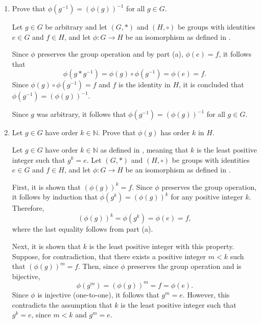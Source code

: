 \begin{enumerate}
\begin{enumerate}
\begin{subprove}
      For any $g \in G$, it is observed that $e * g = g$.
      Applying $\phi$ to both sides and using the property that $\phi$ preserves the group operation,
      \[
        \phi(e * g) = \phi(e) \circ \phi(g) = \phi(g).
      \]
      Since $\phi(g) \in H$ and $f$ is the identity in $H$, it follows that
      \[
        \phi(e) \circ \phi(g) = \phi(g) = f \circ \phi(g).
      \]
      By the cancellation property in $H$, it is concluded that $\phi(e) = f$.
    \end{subprove}
    \item Prove that $\phi\left(g^{-1}\right)=(\phi(g))^{-1}$ for all $g \in G$.
    \begin{subprove}
      Let $g \in G$ be arbitrary and let $(G, *)$ and $(H, \circ)$ be groups with identities $e \in G$ and $f \in H$, 
      and let $\phi: G \to H$ be an isomorphism as defined in .
      
      Since $\phi$ preserves the group operation and by part (a), $\phi(e) = f$,
      it follows that
      \[
        \phi(g * g^{-1}) = \phi(g) \circ \phi(g^{-1}) = \phi(e) = f.
      \]
      Since $\phi(g) \circ \phi(g^{-1}) = f$ and $f$ is the identity in $H$,
      it is concluded that $\phi(g^{-1}) = (\phi(g))^{-1}$.
      
      Since $g$ was arbitrary, it follows that $\phi(g^{-1}) = (\phi(g))^{-1}$ for all $g \in G$.
    \end{subprove}
    \item Let $g \in G$ have order $k \in \mathbb{N}$. Prove that $\phi(g)$ has order $k$ in $H$.
    \begin{subprove}
      Let $g \in G$ have order $k \in \mathbb{N}$ as defined in , 
      meaning that $k$ is the least positive integer such that $g^k = e$.
      Let $(G, *)$ and $(H, \circ)$ be groups with identities $e \in G$ and $f \in H$, 
      and let $\phi: G \to H$ be an isomorphism as defined in .
      
      First, it is shown that $(\phi(g))^k = f$.
      Since $\phi$ preserves the group operation, it follows by induction that 
      $\phi(g^k) = (\phi(g))^k$ for any positive integer $k$.
      Therefore,
      \[
        (\phi(g))^k = \phi(g^k) = \phi(e) = f,
      \]
      where the last equality follows from part (a).
      
      Next, it is shown that $k$ is the least positive integer with this property.
      Suppose, for contradiction, that there exists a positive integer $m < k$ such that $(\phi(g))^m = f$.
      Then, since $\phi$ preserves the group operation and is bijective,
      \[
        \phi(g^m) = (\phi(g))^m = f = \phi(e).
      \]
      Since $\phi$ is injective (one-to-one), it follows that $g^m = e$.
      However, this contradicts the assumption that $k$ is the least positive integer such that $g^k = e$, 
      since $m < k$ and $g^m = e$.
      

\end{subprove}
\end{enumerate}
\end{enumerate}
